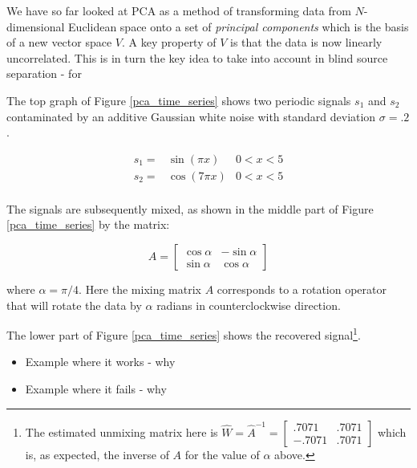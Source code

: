 \documentclass[11pt, oneside, a4paper]{report}
\begin{document}
We have so far looked at PCA as a method of transforming data from
$N$-dimensional Euclidean space onto a set of \emph{principal components}
which is the basis of a new vector space $V$. A key property of $V$ is
that the data is now linearly uncorrelated. This is in turn the key
idea to take into account in blind source separation - for 

The top graph of Figure \ref{pca_time_series} shows two periodic
signals $s_1$ and $s_2$ contaminated by an additive Gaussian white
noise with standard deviation $\sigma = .2$.


\begin{equation}
      \begin{array}{lll}
        s_1 = & \sin(\pi x) & 0<x<5\\
        s_2 = & \cos(7 \pi x) & 0<x<5\\
    \end{array}
\end{equation}

The signals are subsequently mixed, as shown in the middle part of
Figure \ref{pca_time_series} by the matrix:


\begin{equation}
  A = \begin{bmatrix} \cos \alpha & -\sin \alpha \\ \sin \alpha & \cos \alpha \end{bmatrix}
\end{equation}

where $\alpha = \pi/4$. Here the mixing matrix $A$ corresponds to a
rotation operator that will rotate the data by $\alpha$ radians in
counterclockwise direction. 


The lower part of Figure \ref{pca_time_series} shows the recovered
signal\footnote{The estimated unmixing matrix here is $\hat{W} =
  \hat{A}^{-1} = \begin{bmatrix} .7071 & .7071 \\ -.7071 &
    .7071 \end{bmatrix}$ which is, as expected, the inverse of $A$ for
  the value of $\alpha$ above.}.


\begin{itemize}
  \item Example where it works - why
  \item Example where it fails - why
\end{itemize}
\end{document}
